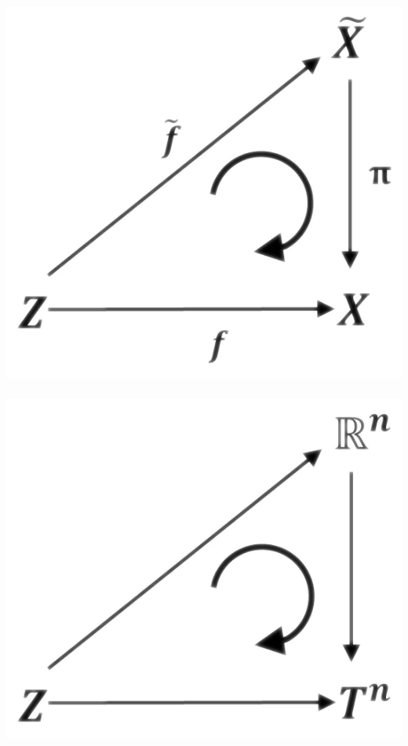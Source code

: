 \documentclass[a4paper,11pt,notitlepage]{report}
\theoremstyle{definition}
\begin{document}
\includegraphics[scale=0.4]{images/Lift_Abbildung.png} $\qquad$
\includegraphics[scale=0.4]{images/Lift_Abbildung_Torus.png}
\end{document}
